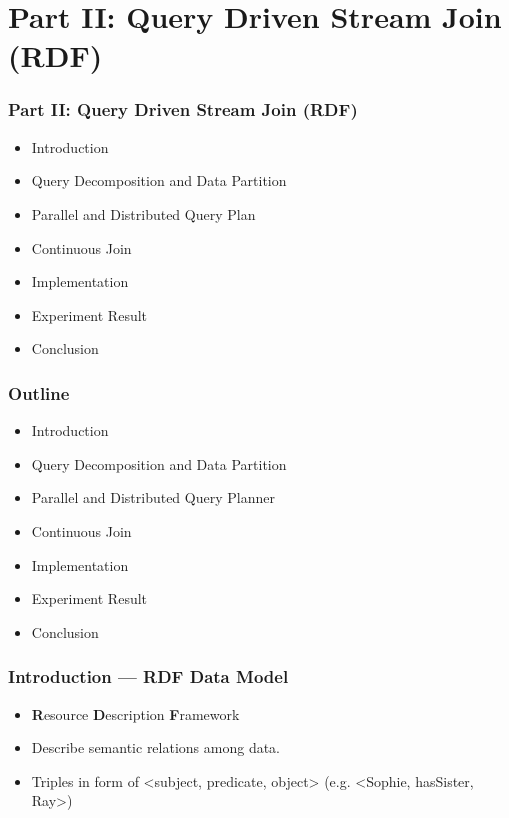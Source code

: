 \section{Part II: Query Driven Stream Join (RDF)}





\begin{frame}
\frametitle{Part II: Query Driven Stream Join (RDF)}
	\begin{itemize}
		\item Introduction
		\item Query Decomposition and Data Partition
		\item Parallel and Distributed Query Plan
		\item Continuous Join
		\item Implementation
		\item Experiment Result
		\item Conclusion
	\end{itemize}
\end{frame}


\begin{frame}
\frametitle{Outline}
	\begin{itemize}
		\item Introduction
		\item \textcolor{blue!20}{Query Decomposition and Data Partition}
		\item \textcolor{blue!20}{Parallel and Distributed Query Planner}
		\item \textcolor{blue!20}{Continuous Join}
		\item \textcolor{blue!20}{Implementation}
		\item \textcolor{blue!20}{Experiment Result}
		\item \textcolor{blue!20}{Conclusion}
	\end{itemize}
\end{frame}

\begin{frame}
\frametitle{Introduction --- RDF Data Model}
\begin{itemize}
\item \textbf{R}esource \textbf{D}escription \textbf{F}ramework 
\item Describe semantic relations among data.
\item Triples in form of <subject, predicate, object> (e.g. <Sophie, hasSister, Ray>)

\end{itemize}
\end{frame}

